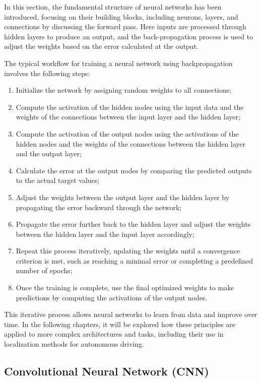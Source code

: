 In this section, the fundamental structure of neural networks has been introduced, focusing on their building blocks, including neurons, layers, and connections by discussing the forward pass. Here inputs are processed through hidden layers to produce an output, and the back-propagation process is used to adjust the weights based on the error calculated at the output.

The typical workflow for training a neural network using backpropagation \cite{10.11648/j.ajnna.20190501.12} involves the following steps:

\begin{enumerate} 
    \item Initialize the network by assigning random weights to all connections;
    \item Compute the activation of the hidden nodes using the input data and the weights of the connections between the input layer and the hidden layer;
    \item Compute the activation of the output nodes using the activations of the hidden nodes and the weights of the connections between the hidden layer and the output layer;
    \item Calculate the error at the output nodes by comparing the predicted outputs to the actual target values;
    \item Adjust the weights between the output layer and the hidden layer by propagating the error backward through the network;
    \item Propagate the error further back to the hidden layer and adjust the weights between the hidden layer and the input layer accordingly;
    \item Repeat this process iteratively, updating the weights until a convergence criterion is met, such as reaching a minimal error or completing a predefined number of epochs;
    \item Once the training is complete, use the final optimized weights to make predictions by computing the activations of the output nodes.
\end{enumerate}

This iterative process allows neural networks to learn from data and improve over time. In the following chapters, it will be explored how these principles are applied to more complex architectures and tasks, including their use in localization methods for autonomous driving.

\subsection{Convolutional Neural Network (CNN)}

